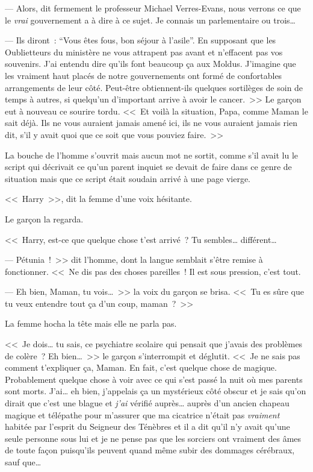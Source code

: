 --- Alors, dit fermement le professeur Michael Verres-Evans, nous verrons ce que le \emph{vrai} gouvernement a à dire à ce sujet. Je connais un parlementaire ou trois…

--- Ils diront~: “Vous êtes fous, bon séjour à l'asile”. En supposant que les Oublietteurs du ministère ne vous attrapent pas avant et n'effacent pas vos souvenirs. J'ai entendu dire qu'ils font beaucoup ça aux Moldus. J'imagine que les vraiment haut placés de notre gouvernements ont formé de confortables arrangements de leur côté. Peut-être obtiennent-ils quelques sortilèges de soin de temps à autres, si quelqu'un d'important arrive à avoir le cancer.~>> Le garçon eut à nouveau ce sourire tordu. <<~Et voilà la situation, Papa, comme Maman le sait déjà. Ils ne vous auraient jamais amené ici, ils ne vous auraient jamais rien dit, s'il y avait quoi que ce soit que vous pouviez faire.~>>

La bouche de l'homme s'ouvrit mais aucun mot ne sortit, comme s'il avait lu le script qui décrivait ce qu'un parent inquiet se devait de faire dans ce genre de situation mais que ce script était soudain arrivé à une page vierge.

<<~Harry~>>, dit la femme d'une voix hésitante.

Le garçon la regarda.

<<~Harry, est-ce que quelque chose t'est arrivé~? Tu sembles… différent…

--- Pétunia~!~>> dit l'homme, dont la langue semblait s'être remise à fonctionner. <<~Ne dis pas des choses pareilles~! Il est sous pression, c'est tout.

--- Eh bien, Maman, tu vois…~>> la voix du garçon se brisa. <<~Tu es sûre que tu veux entendre tout ça d'un coup, maman~?~>>

La femme hocha la tête mais elle ne parla pas.

<<~Je dois… tu sais, ce psychiatre scolaire qui pensait que j'avais des problèmes de colère~? Eh bien…~>> le garçon s'interrompit et déglutit. <<~Je ne sais pas comment t'expliquer ça, Maman. En fait, c'est quelque chose de magique. Probablement quelque chose à voir avec ce qui s'est passé la nuit où mes parents sont morts. J'ai… eh bien, j'appelais ça un mystérieux côté obscur et je sais qu'on dirait que c'est une blague et \emph{j'ai} vérifié auprès… auprès d'un ancien chapeau magique et télépathe pour m'assurer que ma cicatrice n'était pas \emph{vraiment} habitée par l'esprit du Seigneur des Ténèbres et il a dit qu'il n'y avait qu'une seule personne sous lui et je ne pense pas que les sorciers ont vraiment des âmes de toute façon puisqu'ils peuvent quand même subir des dommages cérébraux, sauf que…

